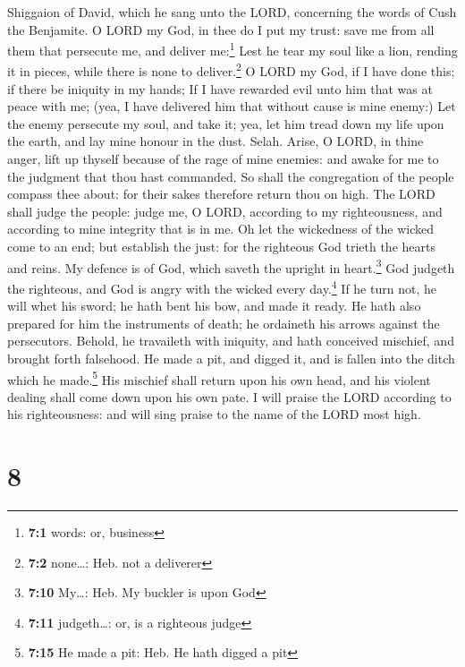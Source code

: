 Shiggaion of David, which he sang unto the LORD, concerning the words of
Cush the Benjamite.  O LORD my God, in thee do I put my
trust: save me from all them that persecute me, and deliver
me:\footnote{\textbf{7:1} words: or, business}  Lest he
tear my soul like a lion, rending it in pieces, while there is none to
deliver.\footnote{\textbf{7:2} none\ldots: Heb. not a deliverer}
 O LORD my God, if I have done this; if there be iniquity
in my hands;  If I have rewarded evil unto him that was at
peace with me; (yea, I have delivered him that without cause is mine
enemy:)  Let the enemy persecute my soul, and take it;
yea, let him tread down my life upon the earth, and lay mine honour in
the dust. Selah.  Arise, O LORD, in thine anger, lift up
thyself because of the rage of mine enemies: and awake for me to the
judgment that thou hast commanded.  So shall the
congregation of the people compass thee about: for their sakes therefore
return thou on high.  The LORD shall judge the people:
judge me, O LORD, according to my righteousness, and according to mine
integrity that is in me.  Oh let the wickedness of the
wicked come to an end; but establish the just: for the righteous God
trieth the hearts and reins.  My defence is of God, which
saveth the upright in heart.\footnote{\textbf{7:10} My\ldots: Heb. My
  buckler is upon God}  God judgeth the righteous, and
God is angry with the wicked every day.\footnote{\textbf{7:11}
  judgeth\ldots: or, is a righteous judge}  If he turn
not, he will whet his sword; he hath bent his bow, and made it ready.
 He hath also prepared for him the instruments of death;
he ordaineth his arrows against the persecutors.  Behold,
he travaileth with iniquity, and hath conceived mischief, and brought
forth falsehood.  He made a pit, and digged it, and is
fallen into the ditch which he made.\footnote{\textbf{7:15} He made a
  pit: Heb. He hath digged a pit}  His mischief shall
return upon his own head, and his violent dealing shall come down upon
his own pate.  I will praise the LORD according to his
righteousness: and will sing praise to the name of the LORD most high.

\hypertarget{section-7}{%
\section{8}\label{section-7}}

